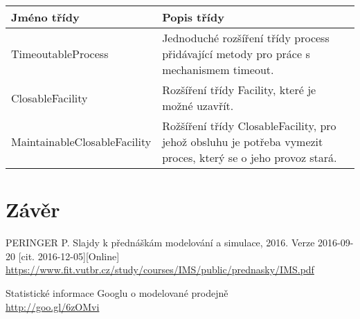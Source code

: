 \documentclass[12pt,a4paper,titlepage]{article}
\begin{document}
\begin{center}
    \begin{tabular}{| l | l | }
    \hline
    Jméno  třídy & Popis třídy  \\ \hline
    TimeoutableProcess & Jednoduché rozšíření třídy process přidávající metody pro práce s mechanismem timeout. \\ \hline
    ClosableFacility &  Rozšíření třídy Facility, které je možné uzavřít. \\ \hline
    MaintainableClosableFacility & Rožšíření třídy ClosableFacility, pro jehož obsluhu je potřeba vymezit proces, který se o jeho provoz stará.  \\
    \hline
    \end{tabular}
\end{center}


\section{Závěr}
\begin{enumerate}[label={[\arabic*]}]
\item PERINGER P. Slajdy k přednáškám modelování a simulace, 2016. Verze  2016-09-20 [cit. 2016-12-05][Online] \\ 
     \href{https://www.fit.vutbr.cz/study/courses/IMS/public/prednasky/IMS.pdf}
          {https://www.fit.vutbr.cz/study/courses/IMS/public/prednasky/IMS.pdf}
     \label{prezentace}
\item Statistické informace Googlu o modelované prodejně \\
     \href{http://goo.gl/6zOMvi}
          {http://goo.gl/6zOMvi} 
     \label{google-shop}
\end{enumerate}
\end{document}
